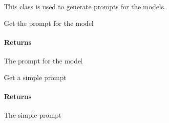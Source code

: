 \documentclass[letterpaper,10pt,english]{sphinxmanual}
\begin{document}
\begin{fulllineitems}
\label{\detokenize{autoapi/prompt/index:prompt.Prompts}}
\pysigstartsignatures
{}
\pysigstopsignatures
\sphinxAtStartPar
This class is used to generate prompts for the models.

\begin{fulllineitems}
\label{\detokenize{autoapi/prompt/index:prompt.Prompts.get_prompt}}
\pysigstartsignatures
{}
\pysigstopsignatures
\sphinxAtStartPar
Get the prompt for the model


\paragraph{Returns}
\label{\detokenize{autoapi/prompt/index:returns}}\begin{description}
\sphinxAtStartPar
The prompt for the model

\end{description}

\end{fulllineitems}


\begin{fulllineitems}
\label{\detokenize{autoapi/prompt/index:prompt.Prompts._simple_prompt}}
\pysigstartsignatures
{}
\pysigstopsignatures
\sphinxAtStartPar
Get a simple prompt


\paragraph{Returns}
\label{\detokenize{autoapi/prompt/index:id1}}\begin{description}
\sphinxAtStartPar
The simple prompt

\end{description}

\end{fulllineitems}


\end{fulllineitems}
\end{document}

